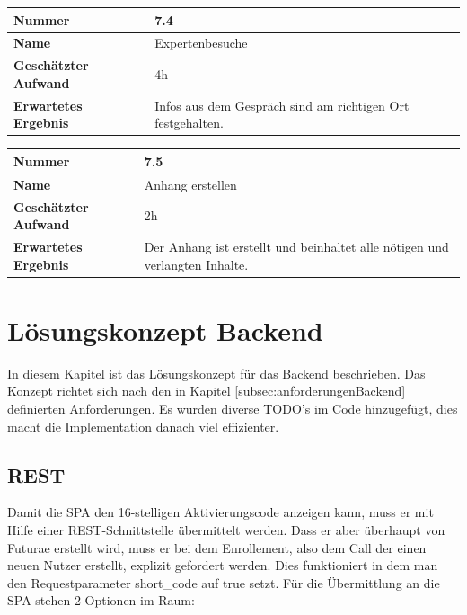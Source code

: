 \begin{longtable}{p{}|p{}}
	\hline
	\textbf{Nummer}    				& 7.4 \\
	\hline
	\textbf{Name}   				& Expertenbesuche\\
	\hline
	\textbf{Geschätzter Aufwand}	& 4h \\
	\hline
	\textbf{Erwartetes Ergebnis}	& Infos aus dem Gespräch sind am richtigen Ort festgehalten.\\
	\hline
\end{longtable}

\begin{longtable}{p{}|p{}}
	\hline
	\textbf{Nummer}    				& 7.5 \\
	\hline
	\textbf{Name}   				& Anhang erstellen\\
	\hline
	\textbf{Geschätzter Aufwand}	& 2h \\
	\hline
	\textbf{Erwartetes Ergebnis}	& Der Anhang ist erstellt und beinhaltet alle nötigen und verlangten Inhalte.\\
	\hline
\end{longtable} 
\newpage

\section{Lösungskonzept Backend}

In diesem Kapitel ist das Lösungskonzept für das Backend beschrieben. Das Konzept richtet sich nach den in Kapitel \ref{subsec:anforderungenBackend} definierten Anforderungen. Es wurden diverse TODO's im Code hinzugefügt, dies macht die Implementation danach viel effizienter.

\subsection{REST}

Damit die SPA den 16-stelligen Aktivierungscode anzeigen kann, muss er mit Hilfe einer REST-Schnittstelle übermittelt werden. Dass er aber überhaupt von Futurae erstellt wird, muss er bei dem Enrollement, also dem Call der einen neuen Nutzer erstellt, explizit gefordert werden. 
Dies funktioniert in dem man den Requestparameter \flqq short\_code\frqq{} auf true setzt. Für die Übermittlung an die SPA stehen 2 Optionen im Raum:

